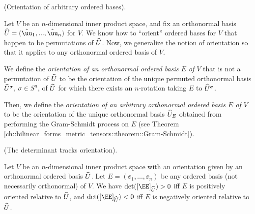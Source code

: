 \begin{defn}
    (Orientation of arbitrary ordered bases).
    
    Let $V$ be an $n$-dimensional inner product space, and fix an orthonormal basis $\hU = (\huu_1, ..., \huu_n)$ for $V$. We know how to ``orient'' ordered bases for $V$ that happen to be permutations of $\widehat{U}$. Now, we generalize the notion of orientation so that it applies to any orthonormal ordered basis of $V$.
    
    We define the \textit{orientation of an orthonormal ordered basis $E$ of $V$} that is not a permutation of $\widehat{U}$ to be the orientation of the unique permuted orthonormal basis $\widehat{U}^\sigma$, $\sigma \in S^n$, of $\widehat{U}$ for which there exists an $n$-rotation taking $E$ to $\widehat{U}^\sigma$.
    
    Then, we define the \textit{orientation of an arbitrary orthonormal ordered basis $E$ of $V$} to be the orientation of the unique orthonormal basis $\widehat{U}_E$ obtained from performing the Gram-Schmidt process on $E$ (see Theorem \ref{ch::bilinear_forms_metric_tensors::theorem::Gram-Schmidt}).
\end{defn}

\begin{theorem}
\label{ch::lin_alg::thm::det_tracks_orientation}
    (The determinant tracks orientation). 
    
    Let $V$ be an $n$-dimensional inner product space with an orientation given by an orthonormal ordered basis $\widehat{U}$. Let $E = (\ee_1, ..., \ee_n)$ be any ordered basis (not necessarily orthonormal) of $V$. We have $\det([\EE]_{\hU}) > 0$ iff $E$ is positively oriented relative to $\widehat{U}$, and $\det([\EE]_{\hU}) < 0$ iff $E$ is negatively oriented relative to $\widehat{U}$.
\end{theorem}

